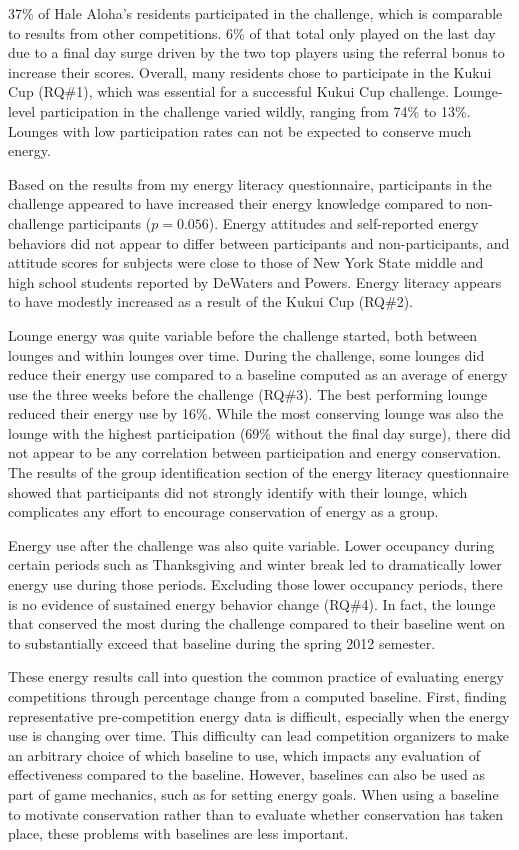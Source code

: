 37\% of Hale Aloha's residents participated in the challenge, which is comparable to results from other competitions. 6\% of that total only played on the last day due to a final day surge driven by the two top players using the referral bonus to increase their scores. Overall, many residents chose to participate in the Kukui Cup (RQ\#1), which was essential for a successful Kukui Cup challenge. Lounge-level participation in the challenge varied wildly, ranging from 74\% to 13\%. Lounges with low participation rates can not be expected to conserve much energy.

Based on the results from my energy literacy questionnaire, participants in the challenge appeared to have increased their energy knowledge compared to non-challenge participants ($p = 0.056$). Energy attitudes and self-reported energy behaviors did not appear to differ between participants and non-participants, and attitude scores for subjects were close to those of New York State middle and high school students reported by DeWaters and Powers. Energy literacy appears to have modestly increased as a result of the Kukui Cup (RQ\#2).

Lounge energy was quite variable before the challenge started, both between lounges and within lounges over time. During the challenge, some lounges did reduce their energy use compared to a baseline computed as an average of energy use the three weeks before the challenge (RQ\#3). The best performing lounge reduced their energy use by 16\%. While the most conserving lounge was also the lounge with the highest participation (69\% without the final day surge), there did not appear to be any correlation between participation and energy conservation. The results of the group identification section of the energy literacy questionnaire showed that participants did not strongly identify with their lounge, which complicates any effort to encourage conservation of energy as a group.

Energy use after the challenge was also quite variable. Lower occupancy during certain periods such as Thanksgiving and winter break led to dramatically lower energy use during those periods. Excluding those lower occupancy periods, there is no evidence of sustained energy behavior change (RQ\#4). In fact, the lounge that conserved the most during the challenge compared to their baseline went on to substantially exceed that baseline during the spring 2012 semester.

These energy results call into question the common practice of evaluating energy competitions through percentage change from a computed baseline. First, finding representative pre-competition energy data is difficult, especially when the energy use is changing over time. This difficulty can lead competition organizers to make an arbitrary choice of which baseline to use, which impacts any evaluation of effectiveness compared to the baseline. However, baselines can also be used as part of game mechanics, such as for setting energy goals. When using a baseline to motivate conservation rather than to evaluate whether conservation has taken place, these problems with baselines are less important.

